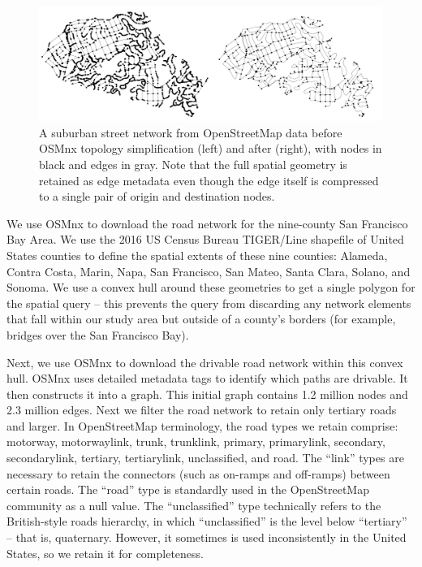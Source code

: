 \begin{figure}[htbp]
    \center
    \includegraphics[width=\textwidth]
    {graphics/simplification_before_after.png}
    \caption{A suburban street network from OpenStreetMap data before OSMnx topology simplification (left) and after (right), with nodes in black and edges in gray. Note that the full spatial geometry is retained as edge metadata even though the edge itself is compressed to a single pair of origin and destination nodes.}
    \label{fig:simplification_before_after}
\end{figure}

We use OSMnx to download the road network for the nine-county San Francisco Bay Area. We use the 2016 US Census Bureau TIGER/Line shapefile of United States counties to define the spatial extents of these nine counties: Alameda, Contra Costa, Marin, Napa, San Francisco, San Mateo, Santa Clara, Solano, and Sonoma. We use a convex hull around these geometries to get a single polygon for the spatial query – this prevents the query from discarding any network elements that fall within our study area but outside of a county's borders (for example, bridges over the San Francisco Bay).

Next, we use OSMnx to download the drivable road network within this convex hull. OSMnx uses detailed metadata tags to identify which paths are drivable. It then constructs it into a graph. This initial graph contains 1.2 million nodes and 2.3 million edges. Next we filter the road network to retain only tertiary roads and larger. In OpenStreetMap terminology, the road types we retain comprise: motorway, motorway\textunderscore link, trunk, trunk\textunderscore link, primary, primary\textunderscore link, secondary, secondary\textunderscore link, tertiary, tertiary\textunderscore link, unclassified, and road. The \enquote{link} types are necessary to retain the connectors (such as on-ramps and off-ramps) between certain roads. The \enquote{road} type is standardly used in the OpenStreetMap community as a null value. The \enquote{unclassified} type technically refers to the British-style roads hierarchy, in which \enquote{unclassified} is the level below \enquote{tertiary} – that is, quaternary. However, it sometimes is used inconsistently in the United States, so we retain it for completeness.

